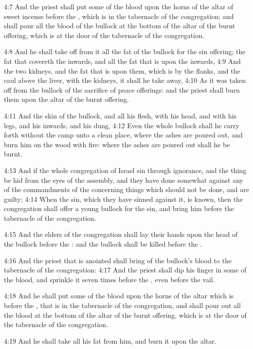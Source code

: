 4:7 And the priest shall put some of the blood upon the horns of the
altar of sweet incense before the \LORD, which is in the tabernacle of
the congregation; and shall pour all the blood of the bullock at the
bottom of the altar of the burnt offering, which is at the door of the
tabernacle of the congregation.

4:8 And he shall take off from it all the fat of the bullock for the
sin offering; the fat that covereth the inwards, and all the fat that
is upon the inwards, 4:9 And the two kidneys, and the fat that is upon
them, which is by the flanks, and the caul above the liver, with the
kidneys, it shall he take away, 4:10 As it was taken off from the
bullock of the sacrifice of peace offerings: and the priest shall burn
them upon the altar of the burnt offering.

4:11 And the skin of the bullock, and all his flesh, with his head,
and with his legs, and his inwards, and his dung, 4:12 Even the whole
bullock shall he carry forth without the camp unto a clean place,
where the ashes are poured out, and burn him on the wood with fire:
where the ashes are poured out shall he be burnt.

4:13 And if the whole congregation of Israel sin through ignorance,
and the thing be hid from the eyes of the assembly, and they have done
somewhat against any of the commandments of the \LORD concerning things
which should not be done, and are guilty; 4:14 When the sin, which
they have sinned against it, is known, then the congregation shall
offer a young bullock for the sin, and bring him before the tabernacle
of the congregation.

4:15 And the elders of the congregation shall lay their hands upon the
head of the bullock before the \LORD: and the bullock shall be killed
before the \LORD.

4:16 And the priest that is anointed shall bring of the bullock's
blood to the tabernacle of the congregation: 4:17 And the priest shall
dip his finger in some of the blood, and sprinkle it seven times
before the \LORD, even before the vail.

4:18 And he shall put some of the blood upon the horns of the altar
which is before the \LORD, that is in the tabernacle of the
congregation, and shall pour out all the blood at the bottom of the
altar of the burnt offering, which is at the door of the tabernacle of
the congregation.

4:19 And he shall take all his fat from him, and burn it upon the
altar.

